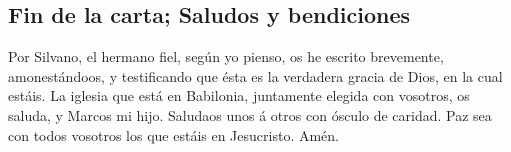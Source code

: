 \hypertarget{fin-de-la-carta-saludos-y-bendiciones}{%
\subsection{Fin de la carta; Saludos y
bendiciones}\label{fin-de-la-carta-saludos-y-bendiciones}}

 Por Silvano, el hermano fiel, según yo pienso, os he
escrito brevemente, amonestándoos, y testificando que ésta es la
verdadera gracia de Dios, en la cual estáis.  La iglesia
que está en Babilonia, juntamente elegida con vosotros, os saluda, y
Marcos mi hijo.  Saludaos unos á otros con ósculo de
caridad. Paz sea con todos vosotros los que estáis en Jesucristo. Amén.

